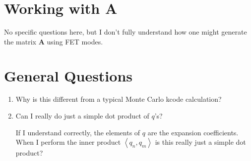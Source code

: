 \documentclass[12pt]{article}
\begin{document}
\section{Working with A}
No specific questions here, but I don't fully understand how one might generate the matrix $\mathbf{A}$ using FET modes. 
\section{General Questions}
\begin{enumerate}
    \item Why is this different from a typical Monte Carlo kcode calculation? \\[1in]

    \item Can I really do just a simple dot product of $q$'s?

    If I understand correctly, the elements of $q$ are the expansion coefficients.  When I perform the inner product $\left\langle q_n, q_m\right\rangle$ is this really just a simple dot product?
\end{enumerate}
\end{document}
